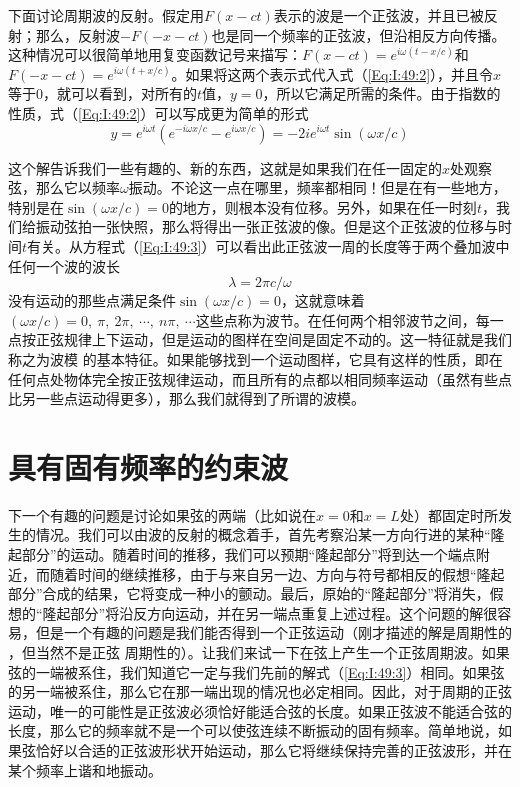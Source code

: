 下面讨论周期波的反射。假定用$F(x-ct)$表示的波是一个正弦波，并且已被反射；那么，反射波$-F(-x-ct)$也是同一个频率的正弦波，但沿相反方向传播。这种情况可以很简单地用复变函数记号来描写：$F(x-ct)=e^{i\omega(t-x/c)}$和$F(-x-ct)=e^{i\omega(t+x/c)}$。如果将这两个表示式代入式（\ref{Eq:I:49:2}），并且令$x$等于0，就可以看到，对所有的$t$值，$y=0$，所以它满足所需的条件。由于指数的性质，式（\ref{Eq:I:49:2}）可以写成更为简单的形式
\begin{equation}
    \label{Eq:I:49:3}
    y =e^{i \omega t}(e^{-i \omega x / c }-e^{i \omega x / c })=-2ie^{i \omega t}\sin(\omega x /c )
\end{equation}

这个解告诉我们一些有趣的、新的东西，这就是如果我们在任一固定的$x$处观察弦，那么它以频率$\omega$振动。不论这一点在哪里，频率都相同！但是在有一些地方，特别是在$\sin(\omega x /c )=0$的地方，则根本没有位移。另外，如果在任一时刻$t$，我们给振动弦拍一张快照，那么将得出一张正弦波的像。但是这个正弦波的位移与时间$t$有关。从方程式（\ref{Eq:I:49:3}）可以看出此正弦波一周的长度等于两个叠加波中任何一个波的波长
\begin{equation}
    \label{Eq:I:49:4}
    \lambda = 2\pi c/\omega
\end{equation}
没有运动的那些点满足条件$\sin(\omega x /c)=0$，这就意味着$(\omega x /c )=0,~\pi,~2\pi,~\cdots,~n \pi,~\cdots$这些点称为波节。在任何两个相邻波节之间，每一点按正弦规律上下运动，但是运动的图样在空间是固定不动的。这一特征就是我们称之为波模 的基本特征。如果能够找到一个运动图样，它具有这样的性质，即在任何点处物体完全按正弦规律运动，而且所有的点都以相同频率运动（虽然有些点比另一些点运动得更多），那么我们就得到了所谓的波模。

\section{具有固有频率的约束波}
下一个有趣的问题是讨论如果弦的两端（比如说在$x=0$和$x=L$处）都固定时所发生的情况。我们可以由波的反射的概念着手，首先考察沿某一方向行进的某种“隆起部分”的运动。随着时间的推移，我们可以预期“隆起部分”将到达一个端点附近，而随着时间的继续推移，由于与来自另一边、方向与符号都相反的假想“隆起部分”合成的结果，它将变成一种小的颤动。最后，原始的“隆起部分”将消失，假想的“隆起部分”将沿反方向运动，并在另一端点重复上述过程。这个问题的解很容易，但是一个有趣的问题是我们能否得到一个正弦运动（刚才描述的解是周期性的 ，但当然不是正弦 周期性的）。让我们来试一下在弦上产生一个正弦周期波。如果弦的一端被系住，我们知道它一定与我们先前的解式（\ref{Eq:I:49:3}）相同。如果弦的另一端被系住，那么它在那一端出现的情况也必定相同。因此，对于周期的正弦运动，唯一的可能性是正弦波必须恰好能适合弦的长度。如果正弦波不能适合弦的长度，那么它的频率就不是一个可以使弦连续不断振动的固有频率。简单地说，如果弦恰好以合适的正弦波形状开始运动，那么它将继续保持完善的正弦波形，并在某个频率上谐和地振动。

